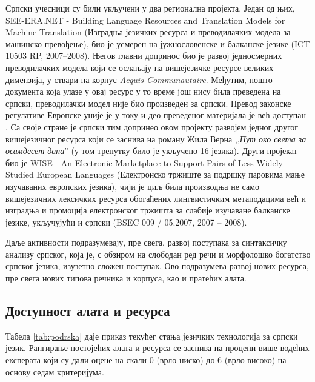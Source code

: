 \begin{multicols}{2}
Српски учесници су били укључени у два регионална пројекта. Један од њих, SEE-ERA.NET - Building Language Resources and Translation Models for Machine Translation (Изградња језичких ресурса и преводилачких модела за машинско превођење), био је усмерен на јужнословенске и балканске језике (ICT 10503 RP, 2007--2008). Његов главни допринос био је развој једносмерних преводилачких модела који се ослањају на вишејезичке ресурсе великих димензија, у ствари на корпус \textit{Acquis Communautaire}.  Међутим, пошто документа која улазе у овај ресурс у то време још нису била преведена на српски, преводилачки модел није био произведен за српски. Превод законске регулативе Европске уније је у току и део преведеног материјала је већ доступан \cite{PREVODJENJE}. Са своје стране је српски тим допринео овом пројекту развојем једног другог вишејезичног ресурса који се заснива на роману Жила Верна ,,\textit{Пут око света за осамдесет дана}'' (у том тренутку било је укључено 16 језика). Други пројекат био је WISE - An Electronic Marketplace to Support Pairs of Less Widely Studied European Languages (Електронско тржиште за подршку паровима мање изучаваних европских језика), чији је циљ била производња не само вишејезичних лексичких ресурса обогаћених лингвистичким метаподацима већ и изградња и промоција електронског тржишта за слабије изучаване балканске језике, укључујући и српски (BSEC 009 / 05.2007, 2007 -- 2008).

Даље активности подразумевају, пре свега, развој поступака за синтаксичку анализу српског, која је, с обзиром на слободан ред речи и морфолошко богатство српског језика, изузетно сложен поступак. Ово подразумева развој нових ресурса, пре свега нових типова речника и корпуса, као и пратећих алата.
 
 \subsection {Доступност алата и ресурса}
   
Табела \ref{tab:podrska} даје приказ текућег стања језичких технологија за српски језик. Рангирање постојећих алата и ресурса се заснива на процени више водећих експерата који су дали оцене на скали 0 (врло ниско) до 6 (врло високо) на основу седам критеријума. 



\begin{table}[ht]
\centering


\end{table}
\end{multicols}
